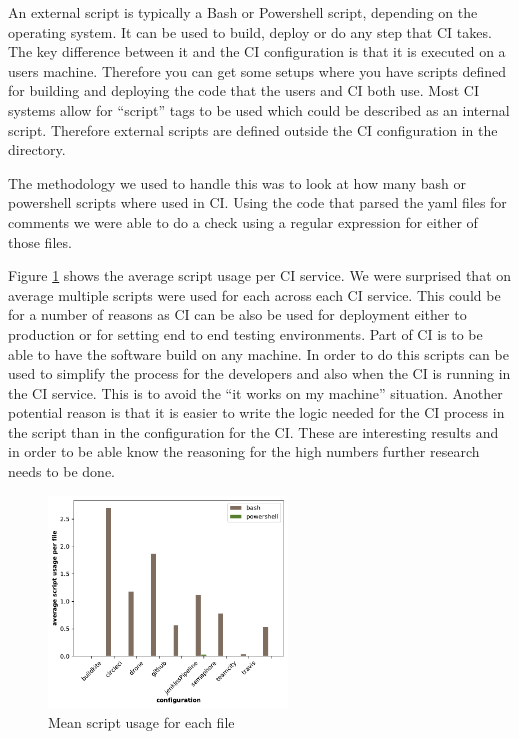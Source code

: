 \documentclass[10pt,conference]{IEEEtran}
\begin{document}
An external script is typically a Bash or Powershell script, depending on the operating system. It can be used to build, deploy or do any step that CI takes. The key difference between it and the CI configuration is that it is executed on a users machine. Therefore you can get some setups where you have scripts defined for building and deploying the code that the users and CI both use. Most CI systems allow for \enquote{script} tags to be used which could be described as an internal script. Therefore external scripts are defined outside the CI configuration in the directory.

The methodology we used to handle this was to look at how many bash or powershell scripts where used in CI. Using the code that parsed the yaml files for comments we were able to do a check using a regular expression for either of those files.  

Figure \ref{fig:script_usage} shows the average script usage per CI service. We were surprised that on average multiple scripts were used for each across each CI service. This could be for a number of reasons as CI can be also be used for deployment either to production or for setting end to end testing environments. Part of CI is to be able to have the software build on any machine. In order to do this scripts can be used to simplify the process for the developers and also when the CI is running in the CI service. This is to avoid the \enquote{it works on my machine} situation.
Another potential reason is that it is easier to write the logic needed for the CI process in the script than in the configuration for the CI. 
These are interesting results and in order to be able know the reasoning for the high numbers further research needs to be done.

\begin{figure}[!ht]
  \includegraphics[width=2.5in]{../src/results/scripts usage bars.pdf}
  \caption[alt text]{Mean script usage for each file}
  \label{fig:script_usage}  
\end{figure}
\end{document}
